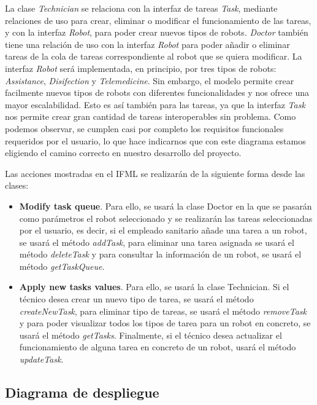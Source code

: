  La clase \textit{Technician} se relaciona con la interfaz de tareas \textit{Task}, mediante relaciones de uso para crear, eliminar o modificar el funcionamiento de las tareas, y con la interfaz \textit{Robot}, para poder crear nuevos tipos de robots. \textit{Doctor} también tiene una relación de uso con la interfaz \textit{Robot} para poder añadir o eliminar tareas de la cola de tareas correspondiente al robot que se quiera modificar. La interfaz \textit{Robot} será implementada, en principio, por tres tipos de robots: \textit{Assistance}, \textit{Disifection} y \textit{Telemedicine}. Sin embargo, el modelo permite crear facilmente nuevos tipos de robots con diferentes funcionalidades y nos ofrece una mayor escalabilidad. Esto es así también para las tareas, ya que la interfaz \textit{Task} nos permite crear gran cantidad de tareas interoperables sin problema. Como podemos observar, se cumplen casi por completo los requisitos funcionales requeridos por el usuario, lo que hace indicarnos que con este diagrama estamos eligiendo el camino correcto en nuestro desarrollo del proyecto. 
 
Las acciones mostradas en el IFML se realizarán de la siguiente forma desde las clases:

\begin{itemize}
  \item \textbf{Modify task queue}. Para ello, se usará la clase Doctor en la que se pasarán como parámetros el robot seleccionado y se realizarán las tareas seleccionadas por el usuario, es decir, si el empleado sanitario añade una tarea a un robot, se usará el método \textit{addTask}, para eliminar una tarea asignada se usará el método \textit{deleteTask} y para consultar la información de un robot, se usará el método \textit{getTaskQueue}.
  
  \item \textbf{Apply new tasks values}. Para ello, se usará la clase Technician. Si el técnico desea crear un nuevo tipo de tarea, se usará el método \textit{createNewTask}, para eliminar tipo de tareas, se usará el método \textit{removeTask} y para poder visualizar todos los tipos de tarea para un robot en concreto, se usará el método \textit{getTasks}. Finalmente, si el técnico desea actualizar el funcionamiento de alguna tarea en concreto de un robot, usará el método \textit{updateTask}.
\end{itemize}

\subsection{Diagrama de despliegue}

